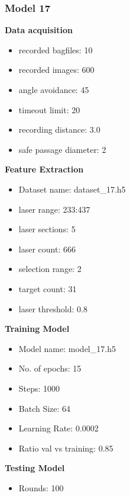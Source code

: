 \subsubsection{Model 17\label{model_17} }
\begin{multicols}{2}\textbf{Data acquisition}
\begin{itemize}
\setlength\itemsep{0.1em}
\item recorded bagfiles: 10
\item recorded images: 600
\item angle avoidance: 45
\item timeout limit: 20
\item recording distance: 3.0
\item safe passage diameter: 2
\end{itemize}
\textbf{Feature Extraction}
\begin{itemize}
\setlength\itemsep{0.1em}
\item Dataset name: dataset\_17.h5
\item  laser range: 233:437
\item  laser sections: 5
\item  laser count: 666
\item  selection range: 2
\item  target count: 31
\item  laser threshold: 0.8
\end{itemize}
\columnbreak\textbf{Training Model}
\begin{itemize}
\setlength\itemsep{0.1em}
\item  Model name: model\_17.h5
\item  No. of epochs: 15
\item  Steps: 1000
\item  Batch Size: 64
\item  Learning Rate: 0.0002
\item  Ratio val vs training: 0.85
\end{itemize}
\textbf{Testing Model}
\begin{itemize}
\setlength\itemsep{0.1em}
\item Rounds: 100
\newline
\newline
\newline
\newline
\newline
\newline
\newline
\newline
\end{itemize}

\end{multicols}
